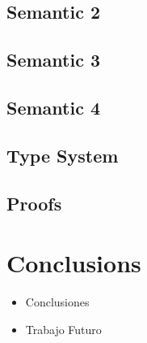 \documentclass{article}
\begin{document}
\subsection{Semantic 2}
\subsection{Semantic 3}
\subsection{Semantic 4}
\subsection{Type System}
\subsection{Proofs}
\section{Conclusions}
\begin{itemize}
\item Conclusiones
\item Trabajo Futuro
\end{itemize}
\medskip 


\end{document}
